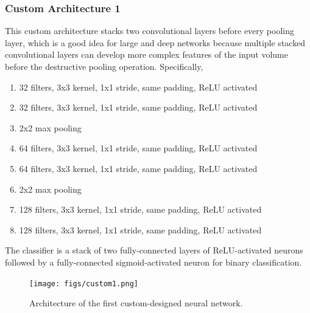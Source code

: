 \subsubsection{Custom Architecture 1}

This custom architecture stacks two convolutional layers before every pooling layer, which is a good idea for large and deep networks because multiple stacked convolutional layers can develop more complex features of the input volume before the destructive pooling operation. Specifically,

\begin{enumerate}
    \item 32 filters, 3x3 kernel, 1x1 stride, same padding, ReLU activated
    \item 32 filters, 3x3 kernel, 1x1 stride, same padding, ReLU activated
    \item 2x2 max pooling
    \item 64 filters, 3x3 kernel, 1x1 stride, same padding, ReLU activated
    \item 64 filters, 3x3 kernel, 1x1 stride, same padding, ReLU activated
    \item 2x2 max pooling
    \item 128 filters, 3x3 kernel, 1x1 stride, same padding, ReLU activated
    \item 128 filters, 3x3 kernel, 1x1 stride, same padding, ReLU activated
\end{enumerate}

The classifier is a stack of two fully-connected layers of ReLU-activated neurons followed by a fully-connected sigmoid-activated neuron for binary classification.

\begin{figure}[ht]
    \centering
    \texttt{[image: figs/custom1.png]}
    \caption{Architecture of the first custom-designed neural network.}
    \label{fig:custom1}
\end{figure}


